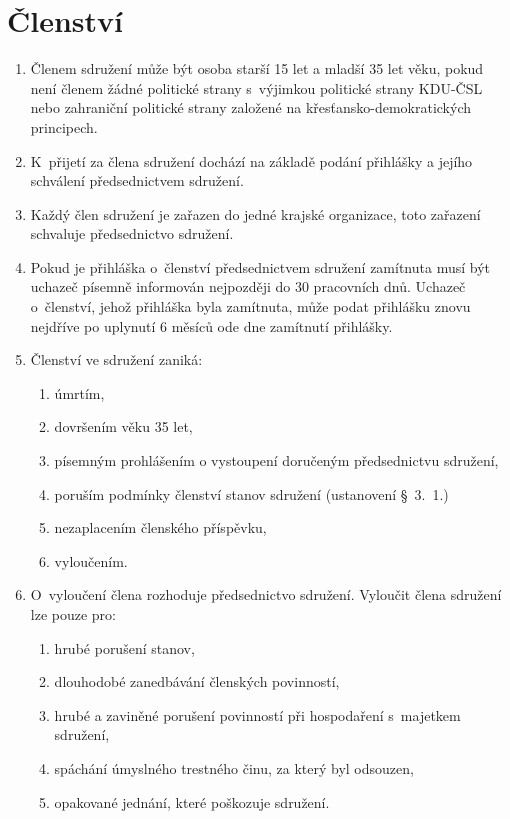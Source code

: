 \documentclass[a4paper]{article}
\begin{document}
\section{Členství}
    \begin{enumerate}
    \item Členem sdružení může být osoba starší 15 let a mladší 35 let věku,
        pokud není členem žádné politické strany s~výjimkou politické strany
        KDU-ČSL nebo zahraniční politické strany založené na
        křesťansko-demokratických principech.

    \item K~přijetí za člena sdružení dochází na základě podání přihlášky a
        jejího schválení předsednictvem sdružení.

    \item Každý člen sdružení je zařazen do jedné krajské organizace, toto
        zařazení schvaluje předsednictvo sdružení.

    \item Pokud je přihláška o~členství předsednictvem sdružení zamítnuta
        musí být uchazeč písemně informován nejpozději do 30 pracovních dnů.
        Uchazeč o~členství, jehož přihláška byla zamítnuta, může podat
        přihlášku znovu nejdříve po uplynutí 6 měsíců ode dne zamítnutí
        přihlášky.

    \item Členství ve sdružení zaniká:
        \begin{enumerate}
        \item úmrtím,
        \item dovršením věku 35 let,
        \item písemným prohlášením o vystoupení doručeným předsednictvu
            sdružení,
        \item poruším podmínky členství stanov sdružení (ustanovení \S~3.~1.)
        \item nezaplacením členského příspěvku,
        \item vyloučením.
        \end{enumerate}

    \item O~vyloučení člena rozhoduje předsednictvo sdružení. Vyloučit člena
        sdružení lze pouze pro:
        \begin{enumerate}
        \item hrubé porušení stanov,
        \item dlouhodobé zanedbávání členských povinností,
        \item hrubé a zaviněné porušení povinností při hospodaření s~majetkem
            sdružení,
        \item spáchání úmyslného trestného činu, za který byl odsouzen,
        \item opakované jednání, které poškozuje sdružení.
        \end{enumerate}


\end{enumerate}
\end{document}
